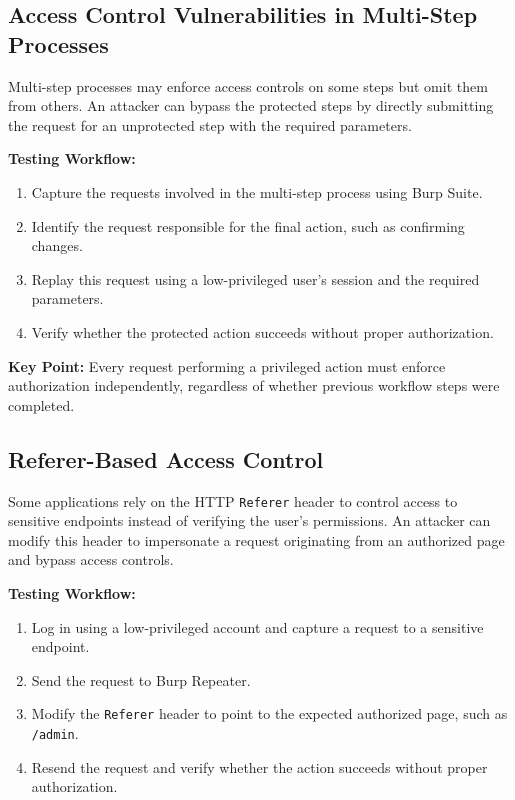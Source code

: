\documentclass[11pt,a4paper]{article}
\begin{document}
\subsection{Access Control Vulnerabilities in Multi-Step Processes}

Multi-step processes may enforce access controls on some steps but omit them from others. An attacker can bypass the protected steps by directly submitting the request for an unprotected step with the required parameters.

\textbf{Testing Workflow:}
\begin{enumerate}
    \item Capture the requests involved in the multi-step process using Burp Suite.
    \item Identify the request responsible for the final action, such as confirming changes.
    \item Replay this request using a low-privileged user's session and the required parameters.
    \item Verify whether the protected action succeeds without proper authorization.
\end{enumerate}

\textbf{Key Point:} Every request performing a privileged action must enforce authorization independently, regardless of whether previous workflow steps were completed.

\subsection{Referer-Based Access Control}

Some applications rely on the HTTP \texttt{Referer} header to control access to sensitive endpoints instead of verifying the user's permissions.
An attacker can modify this header to impersonate a request originating from an authorized page and bypass access controls.

\textbf{Testing Workflow:}
\begin{enumerate}
    \item Log in using a low-privileged account and capture a request to a sensitive endpoint.
    \item Send the request to Burp Repeater.
    \item Modify the \texttt{Referer} header to point to the expected authorized page, such as \texttt{/admin}.
    \item Resend the request and verify whether the action succeeds without proper authorization.
\end{enumerate}
\end{document}
